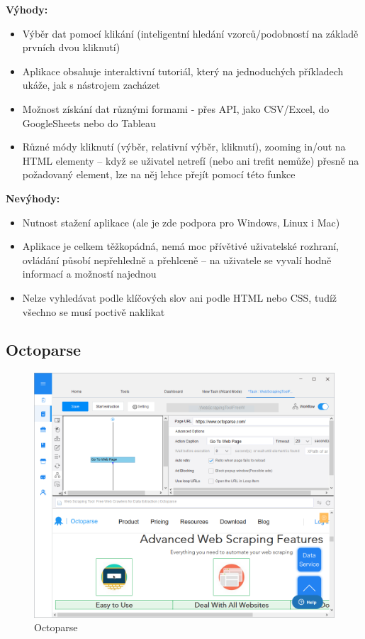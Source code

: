\documentclass[thesis=B,czech]{FITthesis}[2012/06/26]
\begin{document}
\textbf{Výhody:}
\begin{itemize}
	\item Výběr dat pomocí klikání (inteligentní hledání vzorců/podobností na základě prvních dvou kliknutí)
	\item Aplikace obsahuje interaktivní tutoriál, který na jednoduchých příkladech ukáže, jak s nástrojem zacházet
	\item Možnost získání dat různými formami - přes API, jako CSV/Excel, do GoogleSheets nebo do Tableau
	\item Různé módy kliknutí (výběr, relativní výběr, kliknutí), zooming in/out na HTML elementy -- když se uživatel netrefí (nebo ani trefit nemůže) přesně na požadovaný element, lze na něj lehce přejít pomocí této funkce
\end{itemize}

\textbf{Nevýhody:}
\begin{itemize}
	\item Nutnost stažení aplikace (ale je zde podpora pro Windows, Linux i Mac)
	\item Aplikace je celkem těžkopádná, nemá moc přívětivé uživatelské rozhraní, ovládání působí nepřehledně a přehlceně -- na uživatele se vyvalí hodně informací a možností najednou
	\item Nelze vyhledávat podle klíčových slov ani podle HTML nebo CSS, tudíž všechno se musí poctivě naklikat
\end{itemize}


\newpage
\subsection{Octoparse}
\begin{figure}[h]
	\includegraphics[width=\linewidth]{images/Octoparse.png}
	\caption{Octoparse}
	\label{fig:octoparse}
\end{figure}
\end{document}
